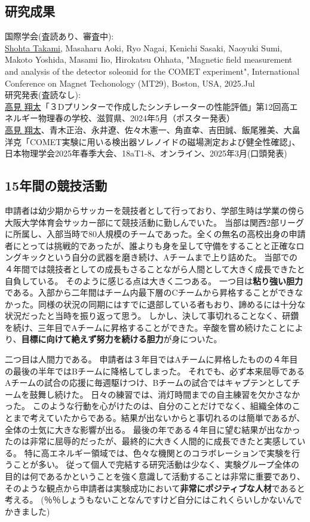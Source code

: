 \documentclass[11pt,a4j,dvipdfmx]{jarticle} 					%
\newcommand{\研究課題名}{COMET Phase-Iに向けたエンジニアリングランおよびその物理解析}
\newcommand{\研究機関名}{大阪大学}
\newcommand{\研究代表者氏名}{高見 翔太   }
\newcommand{\mysubsection}[1]{\vspace{-20pt}\subsection*{\colorbox{cyan!15}{\normalsize{#1}}}\vspace{-0.2cm}}
\begin{document}
\mysubsection{研究成果}
\noindent
国際学会(査読あり、審査中):\\
\uline{Shohta Takami}, Masaharu Aoki, Ryo Nagai, Kenichi Sasaki, Naoyuki Sumi, Makoto Yoshida, Masami Iio, Hirokatsu Ohhata, "Magnetic field measurement and analysis of the detector soleonid for the COMET experiment",
International Conference on Magnet Techonology (MT29), Boston, USA, 2025.Jul\\
\noindent
研究発表(査読なし):\\
\uline{高見 翔太}「３Dプリンターで作成したシンチレーターの性能評価」第12回高エネルギー物理春の学校、滋賀県、2024年5月（ポスター発表）\\
\uline{高見 翔太}、青木正治、永井遼、佐々木憲一、角直幸、吉田誠、飯尾雅美、大畠洋克「COMET実験に用いる検出器ソレノイドの磁場測定および健全性確認」、日本物理学会2025年春季大会、18aT1-8、オンライン、2025年3月(口頭発表)

\mysubsection{15年間の競技活動}
申請者は幼少期からサッカーを競技者として行っており、学部生時は学業の傍ら大阪大学体育会サッカー部にて競技活動に勤しんでいた。
当部は関西2部リーグに所属し、入部当時で80人規模のチームであった。全くの無名の高校出身の申請者にとっては挑戦的であったが、誰よりも身を呈して守備をすることと正確なロングキックという自分の武器を磨き続け、Aチームまで上り詰めた。
当部での４年間では競技者としての成長もさることながら人間として大きく成長できたと自負している。
そのように感じる点は大きく二つある。
一つ目は\textbf{粘り強い胆力}である。入部から二年間はチーム内最下層のCチームから昇格することができなかった。同様の状況の同期にはすでに退部している者もおり、諦めるには十分な状況だったと当時を振り返って思う。
しかし、決して事切れることなく、研鑽を続け、三年目でAチームに昇格することができた。辛酸を嘗め続けたことにより、\textbf{目標に向けて絶えず努力を続ける胆力}が身についた。

二つ目は人間力である。
申請者は３年目ではAチームに昇格したものの４年目の最後の半年ではBチームに降格してしまった。
それでも、必ず本来屈辱であるAチームの試合の応援に毎週駆けつけ、Bチームの試合ではキャプテンとしてチームを鼓舞し続けた。
日々の練習では、消灯時間までの自主練習を欠かさなかった。
このような行動を心がけたのは、自分のことだけでなく、組織全体のことまで考えていたからである。結果が出ないからと事切れるのは簡単であるが、全体の士気に大きな影響が出る。
最後の年である４年目に望む結果が出なかったのは非常に屈辱的だったが、最終的に大きく人間的に成長できたと実感している。
特に高エネルギー領域では、色々な機関とのコラボレーションで実験を行うことが多い。
従って個人で完結する研究活動は少なく、実験グループ全体の目的は何であるかということを強く意識して活動することは非常に重要であり、
そのような観点から申請者は実験成功において\textbf{非常にポジティブな人材}であると考える。
(％％しょうもないことなんですけど自分にはこれくらいしかないんでかきました)
\end{document}
